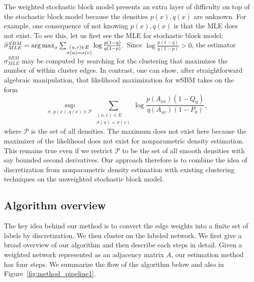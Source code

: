 \documentclass{article}
\begin{document}
The weighted stochastic block model presents an extra layer of difficulty on top of the stochastic block model because the densities $p(x), q(x)$ are unknown. For example, one consequence of not knowing $p(x), q(x)$ is that the MLE does not exist. To see this, let us first see the MLE for stochastic block model:
$
\widehat{\sigma}^{SBM}_{MLE} = \mathop{\text{\rm arg\,max}}_{\sigma}  \sum_{\substack{ (u,v) \in E \\ \sigma(u) = \sigma(v)}} \log \frac{p(1-q)}{q(1-p)}.
$
Since $\log \frac{p (1-q)}{q (1-p)} > 0$, the estimator $\hat{\sigma}^{SBM}_{MLE}$ may be computed by searching for the clustering that maximizes the number of within cluster edges. In contrast, one can show, after straightforward algebraic manipulation, that likelihood maximization for wSBM takes on the form
\[
\sup_{\sigma,\, p(x), q(x) \in \mathcal{P} } \sum_{\substack{ (u,v) \in E \\ \sigma(u) = \sigma(v)}} \log \frac{p(A_{uv}) (1-Q_0)}{q(A_{uv}) (1-P_0)},
\]
where $\mathcal{P}$ is the set of all densities. The maximum does not exist here because the maximizer of the likelihood does not exist for nonparametric density estimation. This remains true even if we restrict $\mathcal{P}$ to be the set of all smooth densities with say bounded second derivatives. Our approach therefore is to combine the idea of discretization from nonparametric density estimation with existing clustering techniques on the unweighted stochastic block model. 

\subsection{Algorithm overview}

The key idea behind our method is to convert the edge weights into a finite set of labels by discretization. We then cluster on the labeled network. We first give a broad overview of our algorithm and then describe each steps in detail. Given a weighted network represented as an adjacency matrix $A$, our estimation method has four steps. We summarize the flow of the algorithm below and also in Figure~\ref{fig:method_pipeline1}.
\end{document}
